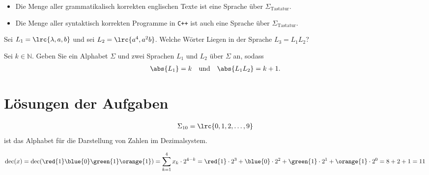 \begin{myexample}\leavevmode
\begin{itemize}
	\item Die Menge aller grammatikalisch korrekten englischen Texte ist eine Sprache über $\Sigma_{\text{Tastatur}}$.
	\item Die Menge aller syntaktisch korrekten Programme in {\tt C++} ist auch eine Sprache über $\Sigma_{\text{Tastatur}}$.
\end{itemize}
\end{myexample}

\begin{myexercise}\label{myexercise:0208}
	Sei $L_1 = \lrc{\lambda, a, b}$ und sei $L_2 = \lrc{a^4, a^2b}$. Welche Wörter Liegen in der Sprache $L_3 = L_1L_2$?
\end{myexercise}

\begin{mychallenge}\label{mychallenge:0209}
	Sei $k\in\mathbb{N}$. Geben Sie ein Alphabet $\Sigma$ und zwei Sprachen $L_1$ und $L_2$ über $\Sigma$ an, sodass
	\begin{align*}
		\abs{L_1} = k\quad \text{und} \quad \abs{L_1L_2} = k + 1.
	\end{align*}
\end{mychallenge}


\clearpage
\section{Lösungen der Aufgaben}
\begin{myanswer}[myexercise:0200]
	\begin{align*}
		\Sigma_{10} = \lrc{0,1,2,\ldots ,9}
	\end{align*}
	ist das Alphabet für die Darstellung von Zahlen im Dezimalsystem.
\end{myanswer}


\begin{myanswer}[myexercise:0298]
	\begin{align*}
		\text{dec}(x) = \text{dec}(\red{1}\blue{0}\green{1}\orange{1}) = \displaystyle\sum_{k=1}^4 x_k\cdot 2^{4-k} = \red{1}\cdot 2^3+\blue{0}\cdot 2^2 + \green{1}\cdot 2^1+\orange{1}\cdot 2^0 = 8 + 2 + 1 = 11
	\end{align*}
\end{myanswer}


